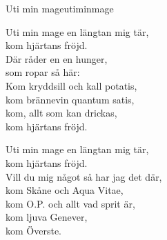 \begin{song}{Uti min mage}{utiminmage}
\begin{vers}
Uti min mage en längtan mig tär,\\
kom hjärtans fröjd.\\
Där råder en en hunger,\\
som ropar så här:\\
Kom kryddsill och kall potatis,\\
kom brännevin quantum satis,\\
kom, allt som kan drickas,\\
kom hjärtans fröjd.\\
\end{vers}
\begin{vers}
Uti min mage en längtan mig tär,\\
kom hjärtans fröjd.\\
Vill du mig något så har jag det där,\\
kom Skåne och Aqua Vitae,\\
kom O.P. och allt vad sprit är,\\
kom ljuva Genever,\\
kom Överste.\\
\end{vers}
\end{song}

